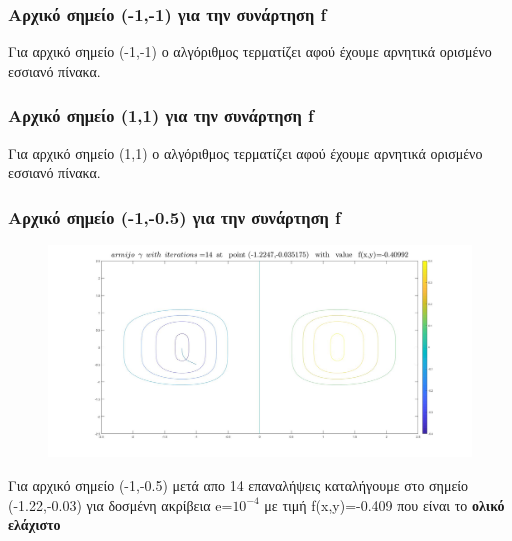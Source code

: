 \documentclass{article}
\begin{document}
\subsubsection*{Αρχικό σημείο (-1,-1) για την συνάρτηση f}
Για αρχικό σημείο (-1,-1) ο αλγόριθμος τερματίζει αφού έχουμε αρνητικά ορισμένο εσσιανό πίνακα. 
 
\subsubsection*{Αρχικό σημείο (1,1) για την συνάρτηση f}
  
Για αρχικό σημείο (1,1) ο αλγόριθμος τερματίζει αφού έχουμε αρνητικά ορισμένο εσσιανό πίνακα. 
\clearpage
\subsubsection*{Αρχικό σημείο (-1,-0.5) για την συνάρτηση f}
\begin{figure}[h!]	
     \centering  
     \advance\leftskip-0.2cm    \includegraphics[width=140mm,scale=2]{armmin2.jpg}
\end{figure} 
Για αρχικό σημείο (-1,-0.5) μετά απο 14 επαναλήψεις καταλήγουμε στο σημείο (-1.22,-0.03) για  δοσμένη ακρίβεια e=$10^{-4}$ με τιμή f(x,y)=-0.409 που είναι  το \textbf{ολικό ελάχιστο} \clearpage
\end{document}
